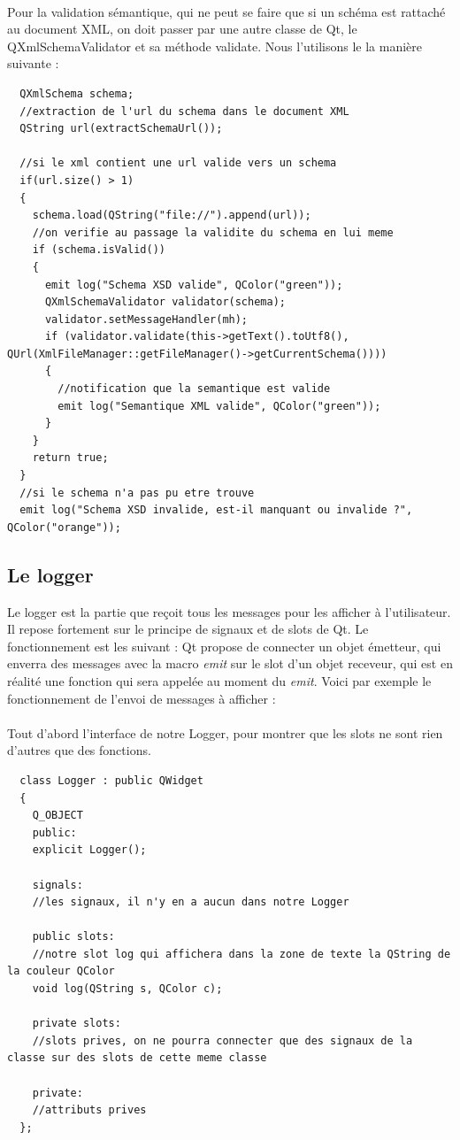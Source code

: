\paragraph{}
Pour la validation sémantique, qui ne peut se faire que si un schéma est rattaché au document XML, on doit passer par une autre classe de Qt, le QXmlSchemaValidator et sa méthode validate. Nous l'utilisons le la manière suivante :
\begin{lstlisting}
  QXmlSchema schema;
  //extraction de l'url du schema dans le document XML
  QString url(extractSchemaUrl());

  //si le xml contient une url valide vers un schema
  if(url.size() > 1)
  {
    schema.load(QString("file://").append(url));
    //on verifie au passage la validite du schema en lui meme
    if (schema.isValid())
    {
      emit log("Schema XSD valide", QColor("green"));
      QXmlSchemaValidator validator(schema);
      validator.setMessageHandler(mh);
      if (validator.validate(this->getText().toUtf8(), QUrl(XmlFileManager::getFileManager()->getCurrentSchema())))
      {
        //notification que la semantique est valide
        emit log("Semantique XML valide", QColor("green"));
      }
    }
    return true;
  }
  //si le schema n'a pas pu etre trouve
  emit log("Schema XSD invalide, est-il manquant ou invalide ?", QColor("orange"));
\end{lstlisting}
\paragraph{}
\subsection{Le logger}
Le logger est la partie que reçoit tous les messages pour les afficher à l'utilisateur. Il repose fortement sur le principe de signaux et de slots de Qt. Le fonctionnement est les suivant : Qt propose de connecter un objet émetteur, qui enverra des messages avec la macro \textit{emit} sur le slot d'un objet receveur, qui est en réalité une fonction qui sera appelée au moment du \textit{emit}. Voici par exemple le fonctionnement de l'envoi de messages à afficher :

\paragraph{}
Tout d'abord l'interface de notre Logger, pour montrer que les slots ne sont rien d'autres que des fonctions.
\begin{lstlisting}
  class Logger : public QWidget
  {
    Q_OBJECT
    public:
    explicit Logger();
    
    signals:
    //les signaux, il n'y en a aucun dans notre Logger
    
    public slots:
    //notre slot log qui affichera dans la zone de texte la QString de la couleur QColor
    void log(QString s, QColor c);

    private slots:
    //slots prives, on ne pourra connecter que des signaux de la classe sur des slots de cette meme classe

    private:
    //attributs prives
  };
\end{lstlisting}
